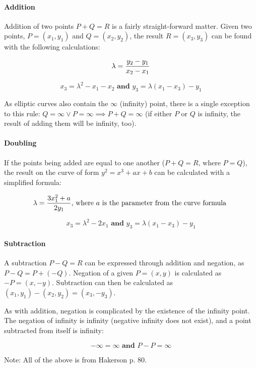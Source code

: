 \paragraph{Addition}

Addition of two points \(P + Q = R\) is a fairly straight-forward matter. Given two points, \(P = (x_1,y_1)\) and
\(Q = (x_2,y_2)\), the result \(R = (x_3,y_3)\) can be found with the following calculations:

\begin{equation}
	\lambda = {{y_2-y_1} \over {x_2-x_1}}
\end{equation}

\begin{equation}
	x_3 = \lambda^2 - x_1 - x_2 \textbf{ and } y_3 = \lambda (x_1 - x_3) - y_1
\end{equation}

As elliptic curves also contain the \(\infty\) (infinity) point, there is a single exception to this
rule: \(Q = \infty \lor P = \infty \implies P + Q = \infty\) (if either \(P\) or \(Q\) is infinity,
the result of adding them will be infinity, too).

\paragraph{Doubling}

If the points being added are equal to one another (\(P + Q = R \text{, where } P = Q\)), the result on the curve of form
\(y^2 = x^3 + ax + b\) can be calculated with a simplified formula:

\begin{equation}
	\lambda = {{3x_1^2 + a} \over {2y_1}} \text{, where } a \text { is the parameter from the curve formula }
\end{equation}

\begin{equation}
	x_3 = \lambda^2 - 2x_1 \textbf{ and } y_3 = \lambda (x_1 - x_3) - y_1
\end{equation}

\paragraph{Subtraction}

A subtraction \(P - Q = R\) can be expressed through addition and negation, as \(P - Q = P + (-Q)\). Negation of a given
\(P = (x,y)\) is calculated as \(-P = (x,-y)\). Subtraction can then be calculated as \((x_1,y_1) - (x_2,y_2) = (x_3,-y_3)\).

As with addition, negation is complicated by the existence of the infinity point. The negation of infinity is infinity (negative
infinity does not exist), and a point subtracted from itself is infinity:

\begin{equation}
	-\infty = \infty \textbf{ and } P - P = \infty
\end{equation}

Note: All of the above is from Hakerson p. 80.